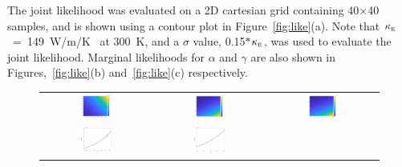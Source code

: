The joint likelihood was evaluated on a 2D cartesian grid containing 40$\times$40 samples, and is shown
using a contour plot in Figure~\ref{fig:like}(a). Note that 
$\kappa_{\tiny{\mbox{E}}}$~=~149~W/m/K~\cite{Shanks:1963} at 300~K, and a $\sigma$ value, 
0.15$\ast$$\kappa_{\tiny{\mbox{E}}}$, was used to evaluate the joint likelihood.
Marginal likelihoods for  $\alpha$ and $\gamma$ are also
shown in Figures,~\ref{fig:like}(b) and~\ref{fig:like}(c) respectively. 
%
\begin{figure}[htbp]
 \begin{center}
 \begin{tabular}{ccc}
  \includegraphics[width=0.33\textwidth]{./Figures/gl_al}
  &
  \includegraphics[width=0.33\textwidth]{./Figures/gl}
  &
  \includegraphics[width=0.33\textwidth]{./Figures/gl_lg}
  \\
  \includegraphics[width=0.30\textwidth]{./Figures/pdf_alpha}
  &
  \includegraphics[width=0.30\textwidth]{./Figures/pdf_lambda}

\end{tabular}
\end{center}
\end{figure}$$
